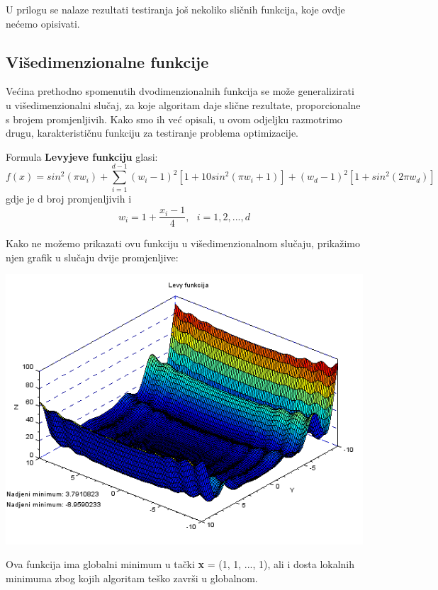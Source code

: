 \documentclass[bosnian,12pt,a4paper]{report}
\begin{document}
\justify
U prilogu se nalaze rezultati testiranja još nekoliko sličnih funkcija, koje ovdje nećemo opisivati.






\subsection{Višedimenzionalne funkcije}
\justify
Većina prethodno spomenutih dvodimenzionalnih funkcija se može generalizirati u višedimenzionalni slučaj, za koje algoritam daje slične rezultate, proporcionalne s brojem promjenljivih. Kako smo ih već opisali, u ovom odjeljku razmotrimo drugu, karakterističnu funkciju za testiranje problema optimizacije.

\justify
Formula \textbf{Levyjeve funkciju} glasi:
$$ f(x) = sin^2(\pi w_i) + \sum_{i=1}^{d-1}(w_i-1)^2[1 + 10sin^2(\pi w_i +1)] + (w_d-1)^2[1+sin^2(2\pi w_d)] $$
gdje je d broj promjenljivih i
$$ w_i=1+\frac{x_i-1}{4}, ~~~ i=1, 2,...,d $$

\newpage
Kako ne možemo prikazati ovu funkciju u višedimenzionalnom slučaju, prikažimo njen grafik u slučaju dvije promjenljive:\\

\begin{center}
   \includegraphics[scale=0.8]{levyfunction.png}
\end{center}


Ova funkcija ima globalni minimum u tački \textbf{x} = (1, 1, ..., 1), ali i dosta lokalnih minimuma zbog kojih algoritam teško završi u globalnom. 
\end{document}
